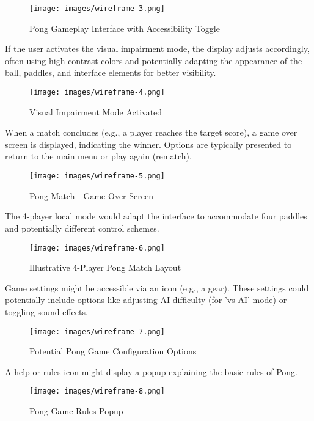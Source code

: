 \begin{figure}[H]
    \texttt{[image: images/wireframe-3.png]}
    \caption{Pong Gameplay Interface with Accessibility Toggle}
    \label{fig:game-interface}
\end{figure}

If the user activates the visual impairment mode, the display adjusts accordingly, often using high-contrast colors and potentially adapting the appearance of the ball, paddles, and interface elements for better visibility.

\begin{figure}[H]
    \texttt{[image: images/wireframe-4.png]}
    \caption{Visual Impairment Mode Activated}
    \label{fig:impairment-mode}
\end{figure}

When a match concludes (e.g., a player reaches the target score), a game over screen is displayed, indicating the winner. Options are typically presented to return to the main menu or play again (rematch).

\begin{figure}[H]
    \texttt{[image: images/wireframe-5.png]}
    \caption{Pong Match - Game Over Screen}
    \label{fig:gameover}
\end{figure}

The 4-player local mode would adapt the interface to accommodate four paddles and potentially different control schemes.

\begin{figure}[H]
    \texttt{[image: images/wireframe-6.png]}
    \caption{Illustrative 4-Player Pong Match Layout}
    \label{fig:4player-match}
\end{figure}

Game settings might be accessible via an icon (e.g., a gear). These settings could potentially include options like adjusting AI difficulty (for 'vs AI' mode) or toggling sound effects.

\begin{figure}[H]
    \texttt{[image: images/wireframe-7.png]}
    \caption{Potential Pong Game Configuration Options}
    \label{fig:config}
\end{figure}

A help or rules icon might display a popup explaining the basic rules of Pong.

\begin{figure}[H]
    \texttt{[image: images/wireframe-8.png]}
    \caption{Pong Game Rules Popup}
    \label{fig:game-rules}
\end{figure}

